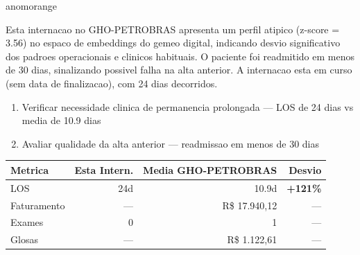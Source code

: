 \documentclass[a4paper,10pt]{article}
\begin{document}
\begin{anomalycard}[Internacao 167107 | GHO-PETROBRAS | ALTO (z=3.56)]{anomorange}
\vspace{2pt}\begin{tcolorbox}[colback=severityred!20,colframe=anomorange,title={\textbf{Interpretacao de Negocio}},fonttitle=\bfseries\small,left=4pt,right=4pt,top=3pt,bottom=3pt]
{\small Esta internacao no GHO-PETROBRAS apresenta um perfil atipico (z-score = 3.56) no espaco de embeddings do gemeo digital, indicando desvio significativo dos padroes operacionais e clinicos habituais. O paciente foi readmitido em menos de 30 dias, sinalizando possivel falha na alta anterior. A internacao esta em curso (sem data de finalizacao), com 24 dias decorridos.}
\end{tcolorbox}
\begin{tcolorbox}[colback=severityyellow!30,colframe=anomorange,title={\textbf{Recomendacoes Especificas}},fonttitle=\bfseries\small,left=4pt,right=4pt,top=3pt,bottom=3pt]
\begin{enumerate}[nosep,leftmargin=16pt]
\item {\small Verificar necessidade clinica de permanencia prolongada --- LOS de 24 dias vs media de 10.9 dias}
\item {\small Avaliar qualidade da alta anterior --- readmissao em menos de 30 dias}
\end{enumerate}
\end{tcolorbox}
\begin{center}\begin{tabular}{l r r r}\toprule\textbf{Metrica} & \textbf{Esta Intern.} & \textbf{Media GHO-PETROBRAS} & \textbf{Desvio} \\\midrule
LOS & 24d & 10.9d & \textcolor{anomred}{\textbf{+121\%}} \\
Faturamento & --- & R\$ 17.940,12 & --- \\
Exames & 0 & 1 & --- \\
Glosas & --- & R\$ 1.122,61 & --- \\
\bottomrule\end{tabular}\end{center}


\end{anomalycard}
\end{document}
